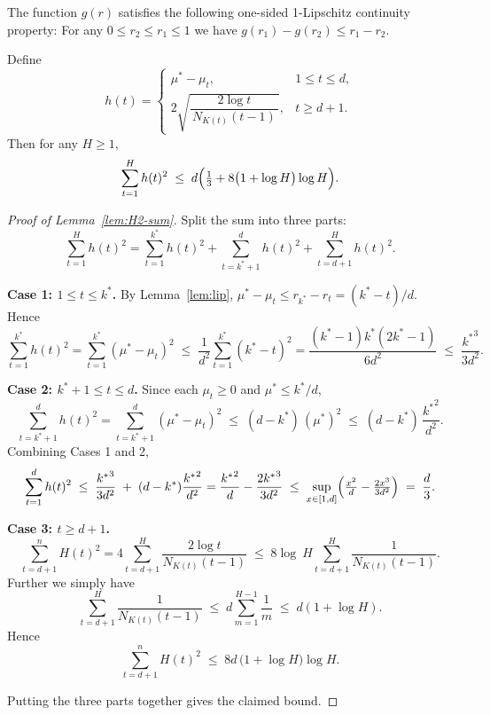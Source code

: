 \documentclass[10pt,a4paper]{amsart}
\begin{document}
\begin{lemma}\label{lem:lip}
The function $g(r)$ satisfies the following one-sided 1-Lipschitz continuity property: For any $0\leq r_2\leq r_1\leq 1$ we have $g(r_1) - g(r_2) \leq r_1 - r_2$.
\end{lemma}

\begin{lemma}\label{lem:H2-sum}
Define
\[
h(t) = 
\begin{cases}
\mu^* - \mu_t, 
&1 \le t \le {d},\\[6pt]
2\sqrt{\dfrac{2\log t}{\,N_{K(t)}(t-1)\,}}, 
&t \ge {d}+1.
\end{cases}
\]
Then for any \(H\ge1\),
\[
\sum_{t=1}^H h(t)^2
\;\le\;
{d}\Bigl(\tfrac{1}{3} + 8\bigl(1+\log H\bigr)\log H\Bigr).
\]
\end{lemma}

\begin{proof}[Proof of Lemma~\ref{lem:H2-sum}]
Split the sum into three parts:
\[
\sum_{t=1}^H h(t)^2
=
\sum_{t=1}^{k^*} h(t)^2
+
\sum_{t=k^*+1}^{{d}} h(t)^2
+
\sum_{t={d}+1}^H h(t)^2.
\]

\noindent\textbf{Case 1: \(1\le t\le k^*\).}  By Lemma~\ref{lem:lip}, \(\mu^*-\mu_t\le r_{k^*}-r_t =  (k^*-t)/{d}\).  Hence
\[
\sum_{t=1}^{k^*}h(t)^2
=\sum_{t=1}^{k^*}(\mu^*-\mu_t)^2
\;\le\;
\frac{1}{{d}^2}\sum_{t=1}^{k^*}(k^*-t)^2
=\frac{(k^*-1)k^*(2k^*-1)}{6{d}^2}
\;\le\;
\frac{{k^*}^3}{3{d}^2}.
\]

\noindent\textbf{Case 2: \(k^*+1\le t\le {d}\).}  Since each \(\mu_t\ge0\) and \(\mu^*\le k^*/{d}\),
\[
\sum_{t=k^*+1}^{{d}}h(t)^2
=\sum_{t=k^*+1}^{{d}}(\mu^*-\mu_t)^2
\;\le\;
({d}-k^*)\,(\mu^*)^2
\;\le\;
({d}-k^*)\,\frac{{k^*}^2}{{d}^2}.
\]
Combining Cases 1 and 2,
\[
\sum_{t=1}^{{d}}h(t)^2
\;\le\;
\frac{{k^*}^3}{3{d}^2}
\;+\;
({d}-k^*)\frac{{k^*}^2}{{d}^2}
=
\frac{{k^*}^2}{{d}}
-\frac{2{k^*}^3}{3{d}^2}
\;\le\;
\sup_{x\in[1,{d}]}\Bigl(\tfrac{x^2}{{d}}-\tfrac{2x^3}{3{d}^2}\Bigr)
\;=\;
\frac{{d}}{3}.
\]

\noindent\textbf{Case 3: \(t\ge{d}+1\).}  
\[
\sum_{t={d}+1}^nH(t)^2
=4\sum_{t={d}+1}^H\frac{2\log t}{N_{K(t)}(t-1)}
\;\le\;
8\log\ H
\sum_{t={d}+1}^H\frac{1}{N_{K(t)}(t-1)}.
\]
Further we simply have
\[
\sum_{t={d}+1}^H\frac{1}{N_{K(t)}(t-1)}
\;\le\;
{d}\sum_{m=1}^{H-1} \frac{1}{m}
\;\le\;
{d}\left(1 + \log H\right).
\]
Hence
\[
\sum_{t={d}+1}^nH(t)^2
\;\le\;
8{d}\,\bigl(1 + \log H\bigr)\log H.
\]

Putting the three parts together gives the claimed bound.
\end{proof}
\end{document}
